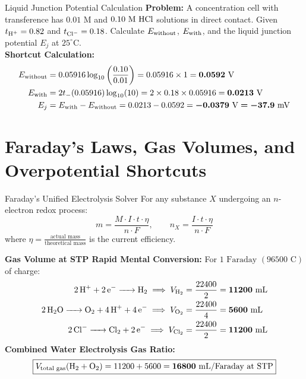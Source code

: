\documentclass[11pt,a4paper]{report}
\newcommand{\ans}[1]{\ifmmode\bm{#1}\else\textbf{#1}\fi}
\begin{document}
\begin{microbox}{Liquid Junction Potential Calculation}
\textbf{Problem:} A concentration cell with transference has $0.01\text{ M}$ and $0.10\text{ M }\ce{HCl}$ solutions in direct contact. Given $t_{\ce{H+}} = 0.82$ and $t_{\ce{Cl-}} = 0.18$. Calculate $E_{\rm without}$, $E_{\rm with}$, and the liquid junction potential $E_j$ at $25^\circ\text{C}$.\\
\textbf{Shortcut Calculation:}
\begin{align*}
E_{\rm without} &= 0.05916 \log_{10}\left(\frac{0.10}{0.01}\right) = 0.05916 \times 1 = \ans{0.0592\text{ V}} \\
E_{\rm with} &= 2 t_- (0.05916) \log_{10}(10) = 2 \times 0.18 \times 0.05916 = \ans{0.0213\text{ V}} \\
E_j &= E_{\rm with} - E_{\rm without} = 0.0213 - 0.0592 = \ans{-0.0379\text{ V} = -37.9\text{ mV}}
\end{align*}
\end{microbox}

\chapter{Faraday's Laws, Gas Volumes, and Overpotential Shortcuts}

\begin{shortcutbox}{Faraday's Unified Electrolysis Solver}
For any substance $X$ undergoing an $n$-electron redox process:
\begin{equation}
\boxed{
m = \frac{M \cdot I \cdot t \cdot \eta}{n \cdot F}, \qquad n_X = \frac{I \cdot t \cdot \eta}{n \cdot F}
}
\end{equation}
where $\eta = \frac{\text{actual mass}}{\text{theoretical mass}}$ is the current efficiency.

\textbf{Gas Volume at STP Rapid Mental Conversion:}
For $1\text{ Faraday } (96500\text{ C})$ of charge:
\begin{align}
\ce{2H+ + 2e^- -> H2} \implies V_{\ce{H2}} &= \frac{22400}{2} = \bm{11200\text{ mL}} \\
\ce{2H2O -> O2 + 4H+ + 4e^-} \implies V_{\ce{O2}} &= \frac{22400}{4} = \bm{5600\text{ mL}} \\
\ce{2Cl^- -> Cl2 + 2e^-} \implies V_{\ce{Cl2}} &= \frac{22400}{2} = \bm{11200\text{ mL}}
\end{align}
\textbf{Combined Water Electrolysis Gas Ratio:}
\begin{equation}
\boxed{
V_{\text{total gas}}(\ce{H2 + O2}) = 11200 + 5600 = \bm{16800\text{ mL/Faraday at STP}}
}
\end{equation}
\end{shortcutbox}
\end{document}
